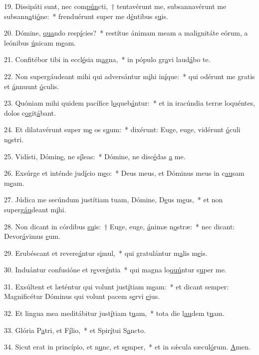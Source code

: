 19. Dissipáti sunt, nec com\uline{pún}cti,~† tentavérunt me, subsannavérunt me subsann\uline{a}ti\uline{ó}ne:~* frenduérunt super me d\uline{é}ntibus s\uline{u}is.\par 
20. Dómine, \uline{qua}ndo resp\uline{í}cies?~* restítue ánimam meam a malignitáte eórum, a leónibus \uline{ú}nicam m\uline{e}am.\par 
21. Confitébor tibi in eccl\uline{é}sia m\uline{a}gna,~* in pópulo gr\uline{a}vi laud\uline{á}bo te.\par 
22. Non supergáudeant mihi qui adversántur m\uline{i}hi in\uline{í}que:~* qui odérunt me gratis et \uline{á}nnuunt \uline{ó}culis.\par 
23. Quóniam mihi quidem pacífice l\uline{o}queb\uline{á}ntur:~* et in iracúndia terræ loquéntes, dolos c\uline{o}git\uline{á}bant.\par 
24. Et dilatavérunt super m\uline{e} os s\uline{u}um:~* dixérunt: Euge, euge, vidérunt \uline{ó}culi n\uline{o}stri.\par 
25. Vidísti, Dómin\uline{e}, ne s\uline{í}leas:~* Dómine, ne disc\uline{é}das \uline{a} me.\par 
26. Exsúrge et inténde jud\uline{í}cio m\uline{e}o:~* Deus meus, et Dóminus meus in c\uline{au}sam m\uline{e}am.\par 
27. Júdica me secúndum justítiam tuam, Dómine, D\uline{e}us m\uline{e}us,~* et non superg\uline{áu}deant m\uline{i}hi.\par 
28. Non dicant in córdibus \uline{su}is:~† Euge, euge, \uline{á}nimæ n\uline{o}stræ:~* nec dicant: Devor\uline{á}vimus \uline{e}um.\par 
29. Erubéscant et revere\uline{á}ntur s\uline{i}mul,~* qui gratulántur m\uline{a}lis m\uline{e}is.\par 
30. Induántur confusióne et r\uline{e}ver\uline{é}ntia~* qui magna lo\uline{quú}ntur s\uline{u}per me.\par 
31. Exsúltent et læténtur qui volunt just\uline{í}tiam m\uline{e}am:~* et dicant semper: Magnificétur Dóminus qui volunt pacem s\uline{e}rvi \uline{e}jus.\par 
32. Et lingua mea meditábitur just\uline{í}tiam t\uline{u}am,~* tota die l\uline{au}dem t\uline{u}am.\par 
33. Glória P\uline{a}tri, et F\uline{í}lio,~* et Spir\uline{í}tui S\uline{a}ncto.\par 
34. Sicut erat in princípio, et n\uline{u}nc, et s\uline{e}mper,~* et in sǽcula sæcul\uline{ó}rum. \uline{A}men.\par 
